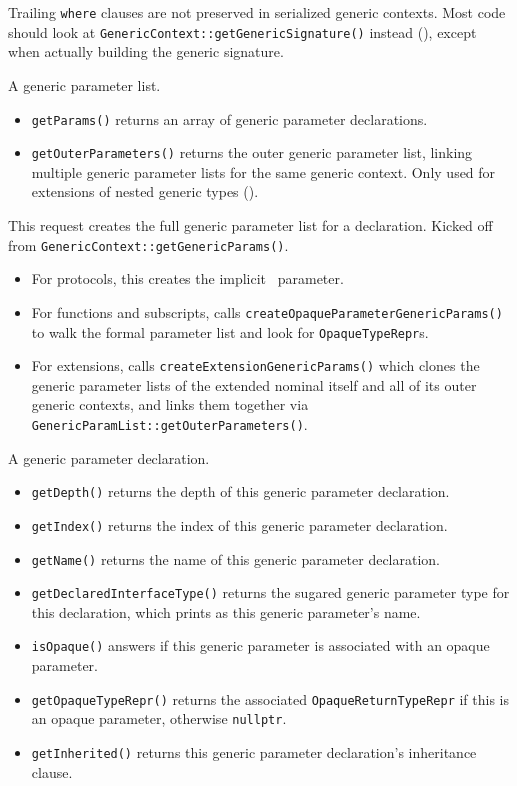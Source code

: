 \documentclass[../generics]{subfiles}
\begin{document}
Trailing \texttt{where} clauses are not preserved in serialized generic contexts. Most code should look at \texttt{GenericContext::getGenericSignature()} instead (), except when actually building the generic signature.


A generic parameter list.
\begin{itemize}
\item \texttt{getParams()} returns an array of generic parameter declarations.
\item \texttt{getOuterParameters()} returns the outer generic parameter list, linking multiple generic parameter lists for the same generic context. Only used for extensions of nested generic types ().
\end{itemize}

This request creates the full generic parameter list for a declaration. Kicked off from \texttt{GenericContext::getGenericParams()}.
\begin{itemize}
\item For protocols, this creates the implicit \tSelf\ parameter.
\item For functions and subscripts, calls \texttt{createOpaqueParameterGenericParams()} to walk the formal parameter list and look for \texttt{OpaqueTypeRepr}s.
\item For extensions, calls \texttt{createExtensionGenericParams()} which clones the generic parameter lists of the extended nominal itself and all of its outer generic contexts, and links them together via \texttt{GenericParamList::getOuterParameters()}.
\end{itemize}

A generic parameter declaration.
\begin{itemize}
\item {}\texttt{getDepth()} returns the depth of this generic parameter declaration.
\item {}\texttt{getIndex()} returns the index of this generic parameter declaration.
\item \texttt{getName()} returns the name of this generic parameter declaration.
\item \texttt{getDeclaredInterfaceType()} returns the sugared generic parameter type for this declaration, which prints as this generic parameter's name.
\item \texttt{isOpaque()} answers if this generic parameter is associated with an opaque parameter.
\item \texttt{getOpaqueTypeRepr()} returns the associated \texttt{OpaqueReturnTypeRepr} if this is an opaque parameter, otherwise \texttt{nullptr}.
\item \texttt{getInherited()} returns this generic parameter declaration's inheritance clause.
\end{itemize}
\end{document}
